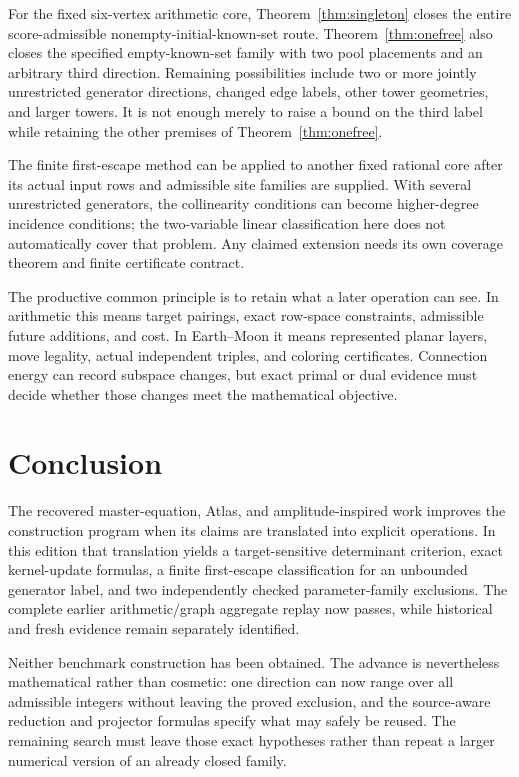 \documentclass[11pt,letterpaper]{article}
\theoremstyle{definition}
\theoremstyle{remark}\newtheorem{remark}[theorem]{Remark}
\begin{document}
For the fixed six-vertex arithmetic core, Theorem~\ref{thm:singleton} closes the entire score-admissible nonempty-initial-known-set route. Theorem~\ref{thm:onefree} also closes the specified empty-known-set family with two pool placements and an arbitrary third direction. Remaining possibilities include two or more jointly unrestricted generator directions, changed edge labels, other tower geometries, and larger towers. It is not enough merely to raise a bound on the third label while retaining the other premises of Theorem~\ref{thm:onefree}.

The finite first-escape method can be applied to another fixed rational core after its actual input rows and admissible site families are supplied. With several unrestricted generators, the collinearity conditions can become higher-degree incidence conditions; the two-variable linear classification here does not automatically cover that problem. Any claimed extension needs its own coverage theorem and finite certificate contract.

The productive common principle is to retain what a later operation can see. In arithmetic this means target pairings, exact row-space constraints, admissible future additions, and cost. In Earth--Moon it means represented planar layers, move legality, actual independent triples, and coloring certificates. Connection energy can record subspace changes, but exact primal or dual evidence must decide whether those changes meet the mathematical objective.

\section{Conclusion}
The recovered master-equation, Atlas, and amplitude-inspired work improves the construction program when its claims are translated into explicit operations. In this edition that translation yields a target-sensitive determinant criterion, exact kernel-update formulas, a finite first-escape classification for an unbounded generator label, and two independently checked parameter-family exclusions. The complete earlier arithmetic/graph aggregate replay now passes, while historical and fresh evidence remain separately identified.

Neither benchmark construction has been obtained. The advance is nevertheless mathematical rather than cosmetic: one direction can now range over all admissible integers without leaving the proved exclusion, and the source-aware reduction and projector formulas specify what may safely be reused. The remaining search must leave those exact hypotheses rather than repeat a larger numerical version of an already closed family.
\end{document}
